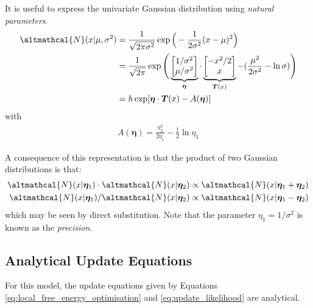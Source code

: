 It is useful to express the univariate Gaussian distribution using \emph{natural parameters}. 
\begin{align}
\altmathcal{N}(x| \mu, \sigma^2) &= \frac{1}{\sqrt{2\pi \sigma^2}} \exp \Big(-\frac{1}{2\sigma^2}(x - \mu)^2 \Big) \nonumber\\
&= \frac{1}{\sqrt{2\pi}} \exp \Bigg( \underbrace{\begin{bmatrix}
1/\sigma^2 \\ \mu/\sigma^2
\end{bmatrix}}_{\bm{\eta}}\cdot \underbrace{\begin{bmatrix}
-x^2/{2} \\ x
\end{bmatrix}}_{\bm{T}(x)}  - (\frac{\mu^2}{2\sigma^2} - \ln \sigma) \Bigg) \nonumber \\
&= h \exp [\bm{\eta} \cdot \bm{T}(x) - A(\bm{\eta})]
\end{align}
with
\begin{align}
A(\bm{\eta}) = \frac{\eta_2^2}{2\eta_1} - \frac{1}{2}\ln \eta_1
\end{align}

A consequence of this representation is that the product of two Gaussian distributions is that:
\begin{align}
\altmathcal{N}(x| \bm{\eta}_1 ) \cdot \altmathcal{N}(x| \bm{\eta}_2) &\propto \altmathcal{N}(x| \bm{\eta}_1 + \bm{\eta}_2) \\
\altmathcal{N}(x| \bm{\eta}_1 ) /  \altmathcal{N}(x| \bm{\eta}_2) &\propto \altmathcal{N}(x| \bm{\eta}_1 - \bm{\eta}_2)
\end{align}
which may be seen by direct substitution. Note that the parameter $\eta_1 = 1/\sigma^2$ is known as the \emph{precision}. 

\subsection{Analytical Update Equations}
For this model, the update equations given by Equations \eqref{eq:local_free_energy_optimisation} and \eqref{eq:update_likelihood} are analytical.


